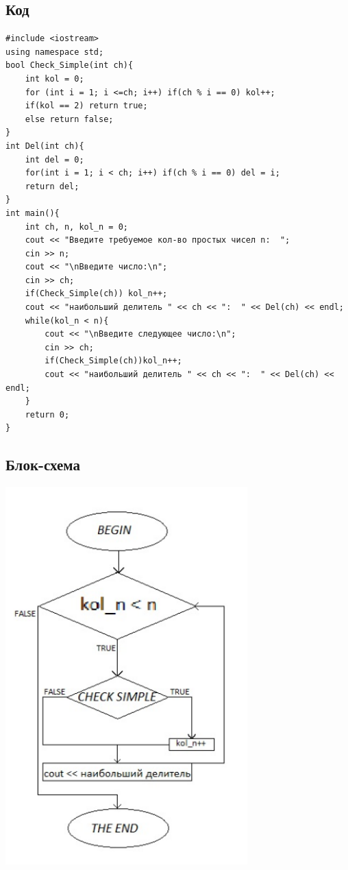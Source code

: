 \documentclass[a4paper]{article}
\begin{document}
\subsection{Код}
\small
\begin{verbatim}
#include <iostream>
using namespace std;
bool Check_Simple(int ch){
    int kol = 0;
    for (int i = 1; i <=ch; i++) if(ch % i == 0) kol++;
    if(kol == 2) return true;
    else return false;
}
int Del(int ch){
    int del = 0;
    for(int i = 1; i < ch; i++) if(ch % i == 0) del = i;
    return del;
}
int main(){
    int ch, n, kol_n = 0;
    cout << "Введите требуемое кол-во простых чисел n:  ";
    cin >> n;
    cout << "\nВведите числo:\n";
    cin >> ch;
    if(Check_Simple(ch)) kol_n++;
    cout << "наибольший делитель " << ch << ":  " << Del(ch) << endl;
    while(kol_n < n){
        cout << "\nВведите следующее число:\n";
        cin >> ch;
        if(Check_Simple(ch))kol_n++;
        cout << "наибольший делитель " << ch << ":  " << Del(ch) << endl;
    }
    return 0;
}
\end{verbatim}\normalsize
\subsection{Блок-схема}
\includegraphics[width=0.7\textwidth]{block2.png}
\end{document}
